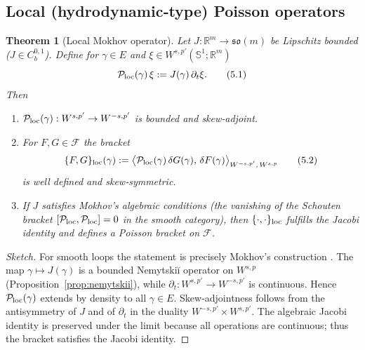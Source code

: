 \documentclass{amsart}
\newcounter{thm}
\newcounter{ex}
\newcounter{re}
\newtheorem{theorem}[thm]{Theorem}
\begin{document}
\subsection{Local (hydrodynamic‑type) Poisson operators}
\begin{theorem}[Local Mokhov operator]\label{th:local-P}
Let \(J:\mathbb R^{m}\to\mathfrak{so}(m)\) be Lipschitz bounded
(\(J\in C^{0,1}_{b}\)).  Define for \(\gamma\in E\) and
\(\xi\in W^{s,p'}(\mathbb S^{1};\mathbb R^{m})\)
\[
\mathcal P_{\rm loc}(\gamma)\,\xi
   := J(\gamma)\,\partial_{t}\xi .
\tag{5.1}
\]
Then
\begin{enumerate}[label=(\roman*)]
  \item \(\mathcal P_{\rm loc}(\gamma):W^{s,p'}\to W^{-s,p'}\) is bounded and skew‑adjoint.
  \item For \(F,G\in\mathcal F\) the bracket
  \[
  \{F,G\}_{\rm loc}(\gamma)
    :=\big\langle\mathcal P_{\rm loc}(\gamma)\,\delta G(\gamma),\,
               \delta F(\gamma)\big\rangle_{W^{-s,p'},\,W^{s,p}}
  \tag{5.2}
  \]
  is well defined and skew‑symmetric.
  \item If \(J\) satisfies Mokhov’s algebraic conditions (the vanishing of the
        Schouten bracket \([\mathcal P_{\rm loc},\mathcal P_{\rm loc}]=0\) in the smooth category),
        then \(\{\cdot,\cdot\}_{\rm loc}\) fulfills the Jacobi identity and defines a Poisson bracket on \(\mathcal F\).
\end{enumerate}
\end{theorem}
\begin{proof}[Sketch]
For smooth loops the statement is precisely Mokhov’s construction
\cite{Mokhov1998,MokhovBook}.  The map
\(\gamma\mapsto J(\gamma)\) is a bounded Nemytskiĭ operator on \(W^{s,p}\) (Proposition~\ref{prop:nemytskii}),
while \(\partial_{t}:W^{s,p'}\to W^{-s,p'}\) is continuous.
Hence \(\mathcal P_{\rm loc}(\gamma)\) extends by density to all \(\gamma\in E\).
Skew‑adjointness follows from the antisymmetry of \(J\) and of \(\partial_{t}\) in the duality
\(W^{-s,p'}\times W^{s,p'}\).
The algebraic Jacobi identity is preserved under the limit because all
operations are continuous; thus the bracket satisfies the Jacobi identity.
\end{proof}
\end{document}
